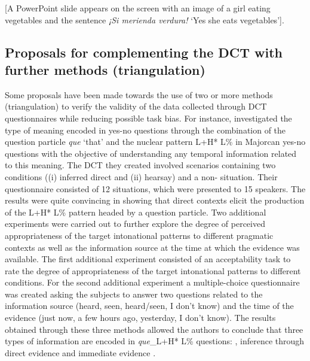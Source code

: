 \documentclass[output=paper]{LSP/langsci}
\begin{document}
[A PowerPoint slide appears on the screen with an image of a girl eating vegetables and the sentence \textit{¡Si merienda verdura!} ‘Yes she eats vegetables’]. 
    \z


\subsection{Proposals for complementing the DCT with further methods (triangulation)}
\label{sec:van:3.3}
Some proposals have been made towards the use of two or more methods (triangulation) to verify the validity of the data collected through DCT questionnaires while reducing possible task bias. For instance, \citet{Vanrell2014evidentiality} investigated the type of meaning encoded in yes-no questions through the combination of the question particle \textit{que} ‘that’ and the nuclear pattern L+H* L\% in Majorcan  yes-no questions with the objective of understanding any temporal information related to this meaning. The DCT they created involved scenarios containing two  conditions ((i) inferred direct  and (ii) hearsay) and a non- situation. Their questionnaire consisted of 12 situations, which were presented to 15 speakers. The results were quite convincing in showing that direct  contexts elicit the production of the L+H* L\% pattern headed by a question particle. Two additional experiments were carried out to further explore the degree of perceived appropriateness of the target intonational patterns to different pragmatic contexts as well as the information source at the time at which the evidence was available. The first additional experiment consisted of an acceptability task to rate the degree of appropriateness of the target intonational patterns to different  conditions. For the second additional experiment a multiple-choice questionnaire was created asking the subjects to answer two questions related to the information source (heard, seen, heard/seen, I don’t know) and the time of the evidence (just now, a few hours ago, yesterday, I don’t know). The results obtained through these three methods allowed the authors to conclude that three types of information are encoded in \textit{que}\_L+H* L\% questions: , inference through direct evidence and immediate evidence \citep[1025]{Vanrell2014evidentiality}.
\end{document}
